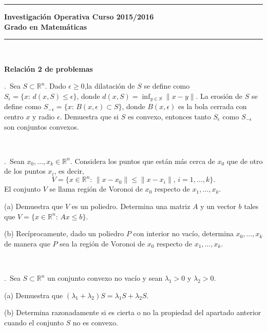 \documentclass[12pt,a4paper,twoside]{article}
\newcounter{problem} \setcounter{problem}{1}
\newcommand{\ex}{\noindent {\sf \bf \theproblem}\addtocounter{problem}{1}.\ }
\begin{document}



\hrule
\bigskip
\textbf{Investigación Operativa   \hfill Curso 2015/2016\\
Grado en Matemáticas}
\bigskip
\hrule

\


\begin{center}  {\bf \large
Relaci\'{o}n 2 de problemas}
\end{center}
\bigskip


\ex Sea $S\subset\mathbb{R}^n$. Dado $\epsilon\geq 0$,la dilatación de $S$ se define como $S_\epsilon=\{x:\, d(x,S)\leq \epsilon\}$, donde $d(x,S)=\inf_{y\in S} \|x-y\|$. La erosión de $S$ se define como $S_{-\epsilon}=\{x:\, B(x,\epsilon)\subset S \}$, donde $B(x,\epsilon)$ es la bola cerrada con centro $x$ y radio $\epsilon$. Demuestra que si $S$ es convexo, entonces tanto $S_\epsilon$ como $S_{-\epsilon}$ son conjuntos convexos. 


\

\ex Sean $x_0,\ldots,x_k\in \mathbb{R}^n$. Considera los puntos que están más cerca de $x_0$ que de otro de los puntos $x_i$, es decir,
\[
V=\{x\in\mathbb{R}^n:\, \|x-x_0\|\leq \|x-x_i\|,\, i=1,\ldots, k\}.
\]
El conjunto $V$ se llama región de Voronoi de $x_0$ respecto de $x_1,\ldots,x_k$.
\begin{compactitem}
\item[(a)] Demuestra que $V$ es un poliedro. Determina una matriz $A$ y un vector $b$ tales que $V=\{x\in\mathbb{R}^n:\, Ax\leq b\}$.
\item[(b)] Recíprocamente, dado un poliedro $P$ con interior no vacío, determina $x_0,\ldots,x_k$ de manera que $P$ sea la  región de Voronoi de $x_0$ respecto de $x_1,\ldots,x_k$.
\end{compactitem}


\



 \ex Sea $S\subset \mathbb{R}^n$ un conjunto convexo no vacío y sean $\lambda_1>0$ y $\lambda_2>0$. 
\begin{compactitem}
\item[(a)] Demuestra que $(\lambda_1+\lambda_2)S=\lambda_1S + \lambda_2S$.
\item[(b)] Determina razonadamente si es cierta o no la propiedad del apartado anterior cuando el conjunto $S$ no es convexo.
\end{compactitem}
\end{document}
